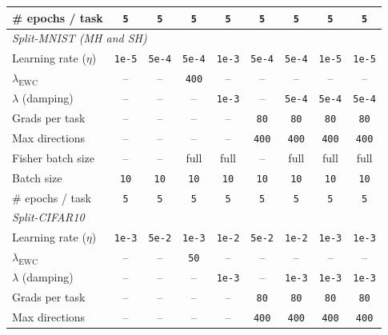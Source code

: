 \begin{table}[H]
{\begin{tabular}{lcccccccc}
\# epochs / task           & \texttt{5}    & \texttt{5}    & \texttt{5}    & \texttt{5}    & \texttt{5}     & \texttt{5}     & \texttt{5}     & \texttt{5}     \\
\midrule
\multicolumn{9}{l}{\textit{Split-MNIST (MH and SH)}} \\
\midrule
Learning rate ($\eta$)     & \texttt{1e-5}  & \texttt{5e-4} & \texttt{5e-4} & \texttt{1e-3} & \texttt{5e-4}  & \texttt{5e-4}  & \texttt{1e-5}  & \texttt{1e-5}  \\
$\lambda_{\mathrm{EWC}}$   & --    & --   & \texttt{400}  & --   & --    & --    & --    & --    \\
$\lambda$ (damping)        & --    & --   & --   & \texttt{1e-3} & --    & \texttt{5e-4}  & \texttt{5e-4}  & \texttt{5e-4}  \\
Grads per task             & --    & --   & --   & --   & \texttt{80}    & \texttt{80}    & \texttt{80}    & \texttt{80}    \\
Max directions             & --    & --   & --   & --   & \texttt{400}   & \texttt{400}   & \texttt{400}   & \texttt{400}   \\
Fisher batch size          & --    & --   & full & full & --    & full  & full  & full  \\
Batch size                 & \texttt{10}    & \texttt{10}   & \texttt{10}   & \texttt{10}   & \texttt{10}    & \texttt{10}    & \texttt{10}    & \texttt{10}    \\
\# epochs / task           & \texttt{5}     & \texttt{5}    & \texttt{5}    & \texttt{5}    & \texttt{5}     & \texttt{5}     & \texttt{5}     & \texttt{5}     \\
\midrule
\multicolumn{9}{l}{\textit{Split-CIFAR10}} \\
\midrule
Learning rate ($\eta$)     & \texttt{1e-3}  & \texttt{5e-2} & \texttt{1e-3} & \texttt{1e-2} & \texttt{5e-2}  & \texttt{1e-2}  & \texttt{1e-3}  & \texttt{1e-3}  \\
$\lambda_{\mathrm{EWC}}$   & --    & --   & \texttt{50}   & --   & --    & --    & --    & --    \\
$\lambda$ (damping)        & --    & --   & --   & \texttt{1e-3} & --    & \texttt{1e-3}  & \texttt{1e-3}  & \texttt{1e-3}  \\
Grads per task             & --    & --   & --   & --   & \texttt{80}    & \texttt{80}    & \texttt{80}    & \texttt{80}    \\
Max directions             & --    & --   & --   & --   & \texttt{400}   & \texttt{400}   & \texttt{400}   & \texttt{400}   \\

\end{tabular}}
\end{table}

